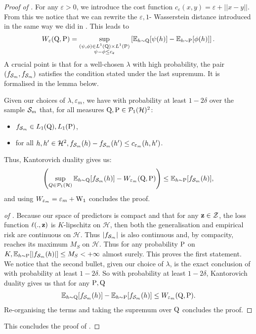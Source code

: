 \begin{noaddcontents}
\begin{proof}[Proof of ]
For any $\varepsilon>0$, we introduce the cost function $c_{\varepsilon}(x,y)= \varepsilon + ||x-y||$.
From this we notice that we can rewrite the $\varepsilon,1$- Wasserstein distance introduced in  the same way we did in . This leads to
\begin{align*}
W_\varepsilon(\Q,\P)= \sup_{\substack{(\psi, \phi) \in L^1(\Q) \times L^1(\P)\\ \psi-\phi \leq c_{\varepsilon}}}\left[\mathbb{E}_{h\sim \Q}[ \psi(h)]- \mathbb{E}_{h\sim \P}[ \phi(h)]\right].
\end{align*}
A crucial point is that for a well-chosen $\lambda$ with high probability, the pair $(f_{\Sm},f_{\Sm})$ satisfies the condition stated under the last supremum. It is formalised in the lemma below.
\begin{lemma}
\label{lem:kanto}
Given our choices of $\lambda,\varepsilon_m$, we have with probability at least $1-2\delta$ over the sample $\Sm$ that, for all measures $\Q,\P\in\mathcal{P}_1(\mathcal{H})^2$:
\begin{itemize}
  \item $f_{\Sm}\in L_1(\Q),L_1(\P)$,
  \item for all $h,h' \in \mathcal{H}^2, f_{\Sm}(h)-f_{\Sm}(h') \leq c_{\varepsilon_m}(h,h')$.
\end{itemize}
Thus, Kantorovich duality gives us:
\[ \left(\sup_{Q\in \mathcal{P}_1(\mathcal{H})} \mathbb{E}_{h\sim \Q}[ f_{\Sm}(h)] -  W_{\varepsilon_m}(\Q,\P) \right)\leq \mathbb{E}_{h\sim \P}[ f_{\Sm}(h)],    \]
and using $W_{\varepsilon_m} = \varepsilon_m + \W_{1}$ concludes the proof.
\end{lemma}
\begin{proof}[ of ]
Because our space of predictors is compact and that for any $\z\in\mathcal{Z}$, the loss function $\ell(.,\z)$ is $K$-lipschitz on $\mathcal{H}$, then both the generalisation and empirical risk are continuous on $\mathcal{H}$. Thus $|f_{\Sm}|$ is also continuous and, by compacity, reaches its maximum $M_S$ on $\mathcal{H}$. Thus for any probability $\P$ on $K, \mathbb{E}_{h\sim \P}[|f_{\Sm}(h)|] \leq M_S < +\infty$ almost surely. This proves the first statement.
We notice that the second bullet, given our choice of $\lambda$, is the exact conclusion  of  with probability at least $1-2\delta$.
So with probability at least $1-2\delta$, Kantorovich duality gives us that for any $\P,\Q$
\begin{align*}
\mathbb{E}_{h\sim \Q}[ f_{\Sm}(h)] - \mathbb{E}_{h\sim \P}[f_{\Sm}(h)] \leq W_{\varepsilon_m}(\Q,\P).
\end{align*}
Re-organising the terms and taking the supremum over $\Q$ concludes the proof.
\end{proof}
This concludes the proof of .
\end{proof}


\end{noaddcontents}
